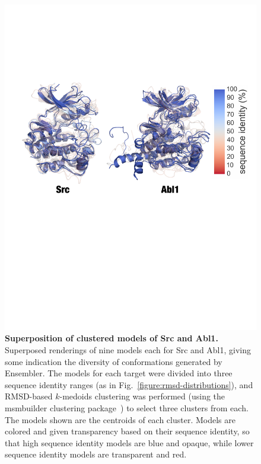 \documentclass[aps,pre,twocolumn,nofootinbib,superscriptaddress,linenumbers]{revtex4-1}
\begin{document}

\begin{figure}[tb]
    \includegraphics[width=1.0\columnwidth]{superposition-src_abl/superposed-seqid_classes-clustered-one_fig}
    
    \caption{{\bf Superposition of clustered models of Src and Abl1.}
    Superposed renderings of nine models each for Src and Abl1, 
    giving some indication the diversity of conformations generated by Ensembler.
    The models for each target were divided into three sequence identity ranges (as in Fig.~\ref{figure:rmsd-distributions}), and RMSD-based $k$-medoids clustering was performed (using the msmbuilder clustering package~\cite{msmbuilder}) to select three clusters from each.
    The models shown are the centroids of each cluster.
    Models are colored and given transparency based on their sequence identity, so that high sequence identity models are blue and opaque, while lower sequence identity models are transparent and red.
  }
  \label{figure:superposition}
\end{figure}
\end{document}
